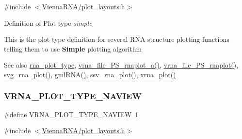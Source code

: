 {\ttfamily \#include $<$\mbox{\hyperlink{plot__layouts_8h}{Vienna\+R\+N\+A/plot\+\_\+layouts.\+h}}$>$}



Definition of Plot type {\itshape simple} 

This is the plot type definition for several R\+NA structure plotting functions telling them to use {\bfseries Simple} plotting algorithm

\begin{DoxySeeAlso}{See also}
\mbox{\hyperlink{group__plotting__utils_ga5964c4581431b098b80027d6e14dcdd4}{rna\+\_\+plot\+\_\+type}}, \mbox{\hyperlink{plot__structure_8h_a139a31dd0ba9fc6612431f67de901c31}{vrna\+\_\+file\+\_\+\+P\+S\+\_\+rnaplot\+\_\+a()}}, \mbox{\hyperlink{plot__structure_8h_abdc8f6548ba4a3bc3cd868ccbcfdb86a}{vrna\+\_\+file\+\_\+\+P\+S\+\_\+rnaplot()}}, \mbox{\hyperlink{plot__structure_8h_ae7853539b5df98f294b4af434e979304}{svg\+\_\+rna\+\_\+plot()}}, \mbox{\hyperlink{plot__structure_8h_a70834bc8c0aad4fe6824ff76ccb8f329}{gml\+R\+N\+A()}}, \mbox{\hyperlink{plot__structure_8h_add368528755f9a830727b680243541df}{ssv\+\_\+rna\+\_\+plot()}}, \mbox{\hyperlink{plot__structure_8h_a2f6d5953e6a323df898896b8d6614483}{xrna\+\_\+plot()}} 
\end{DoxySeeAlso}
\mbox{\label{group__plotting__utils_ga94d4c863ecac2f220f76658afb92f964}} 
\subsubsection{\texorpdfstring{V\+R\+N\+A\+\_\+\+P\+L\+O\+T\+\_\+\+T\+Y\+P\+E\+\_\+\+N\+A\+V\+I\+EW}{VRNA\_PLOT\_TYPE\_NAVIEW}}
{\footnotesize\ttfamily \#define V\+R\+N\+A\+\_\+\+P\+L\+O\+T\+\_\+\+T\+Y\+P\+E\+\_\+\+N\+A\+V\+I\+EW~1}



{\ttfamily \#include $<$\mbox{\hyperlink{plot__layouts_8h}{Vienna\+R\+N\+A/plot\+\_\+layouts.\+h}}$>$}



